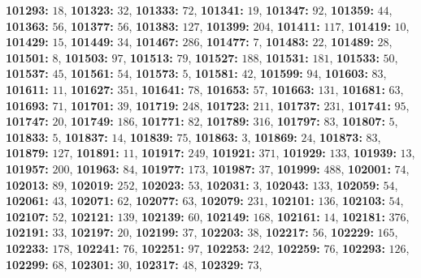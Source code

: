 \textsf{\bfseries 101293:} $18$, \textsf{\bfseries 101323:} $32$, \textsf{\bfseries 101333:} $72$, \textsf{\bfseries 101341:} $19$, \textsf{\bfseries 101347:} $92$, \textsf{\bfseries 101359:} $44$, \textsf{\bfseries 101363:} $56$, \textsf{\bfseries 101377:} $56$, \textsf{\bfseries 101383:} $127$, \textsf{\bfseries 101399:} $204$, \textsf{\bfseries 101411:} $117$, \textsf{\bfseries 101419:} $10$, \textsf{\bfseries 101429:} $15$, \textsf{\bfseries 101449:} $34$, \textsf{\bfseries 101467:} $286$, \textsf{\bfseries 101477:} $7$, \textsf{\bfseries 101483:} $22$, \textsf{\bfseries 101489:} $28$, \textsf{\bfseries 101501:} $8$, \textsf{\bfseries 101503:} $97$, \textsf{\bfseries 101513:} $79$, \textsf{\bfseries 101527:} $188$, \textsf{\bfseries 101531:} $181$, \textsf{\bfseries 101533:} $50$, \textsf{\bfseries 101537:} $45$, \textsf{\bfseries 101561:} $54$, \textsf{\bfseries 101573:} $5$, \textsf{\bfseries 101581:} $42$, \textsf{\bfseries 101599:} $94$, \textsf{\bfseries 101603:} $83$, \textsf{\bfseries 101611:} $11$, \textsf{\bfseries 101627:} $351$, \textsf{\bfseries 101641:} $78$, \textsf{\bfseries 101653:} $57$, \textsf{\bfseries 101663:} $131$, \textsf{\bfseries 101681:} $63$, \textsf{\bfseries 101693:} $71$, \textsf{\bfseries 101701:} $39$, \textsf{\bfseries 101719:} $248$, \textsf{\bfseries 101723:} $211$, \textsf{\bfseries 101737:} $231$, \textsf{\bfseries 101741:} $95$, \textsf{\bfseries 101747:} $20$, \textsf{\bfseries 101749:} $186$, \textsf{\bfseries 101771:} $82$, \textsf{\bfseries 101789:} $316$, \textsf{\bfseries 101797:} $83$, \textsf{\bfseries 101807:} $5$, \textsf{\bfseries 101833:} $5$, \textsf{\bfseries 101837:} $14$, \textsf{\bfseries 101839:} $75$, \textsf{\bfseries 101863:} $3$, \textsf{\bfseries 101869:} $24$, \textsf{\bfseries 101873:} $83$, \textsf{\bfseries 101879:} $127$, \textsf{\bfseries 101891:} $11$, \textsf{\bfseries 101917:} $249$, \textsf{\bfseries 101921:} $371$, \textsf{\bfseries 101929:} $133$, \textsf{\bfseries 101939:} $13$, \textsf{\bfseries 101957:} $200$, \textsf{\bfseries 101963:} $84$, \textsf{\bfseries 101977:} $173$, \textsf{\bfseries 101987:} $37$, \textsf{\bfseries 101999:} $488$, \textsf{\bfseries 102001:} $74$, \textsf{\bfseries 102013:} $89$, \textsf{\bfseries 102019:} $252$, \textsf{\bfseries 102023:} $53$, \textsf{\bfseries 102031:} $3$, \textsf{\bfseries 102043:} $133$, \textsf{\bfseries 102059:} $54$, \textsf{\bfseries 102061:} $43$, \textsf{\bfseries 102071:} $62$, \textsf{\bfseries 102077:} $63$, \textsf{\bfseries 102079:} $231$, \textsf{\bfseries 102101:} $136$, \textsf{\bfseries 102103:} $54$, \textsf{\bfseries 102107:} $52$, \textsf{\bfseries 102121:} $139$, \textsf{\bfseries 102139:} $60$, \textsf{\bfseries 102149:} $168$, \textsf{\bfseries 102161:} $14$, \textsf{\bfseries 102181:} $376$, \textsf{\bfseries 102191:} $33$, \textsf{\bfseries 102197:} $20$, \textsf{\bfseries 102199:} $37$, \textsf{\bfseries 102203:} $38$, \textsf{\bfseries 102217:} $56$, \textsf{\bfseries 102229:} $165$, \textsf{\bfseries 102233:} $178$, \textsf{\bfseries 102241:} $76$, \textsf{\bfseries 102251:} $97$, \textsf{\bfseries 102253:} $242$, \textsf{\bfseries 102259:} $76$, \textsf{\bfseries 102293:} $126$, \textsf{\bfseries 102299:} $68$, \textsf{\bfseries 102301:} $30$, \textsf{\bfseries 102317:} $48$, \textsf{\bfseries 102329:} $73$, 
